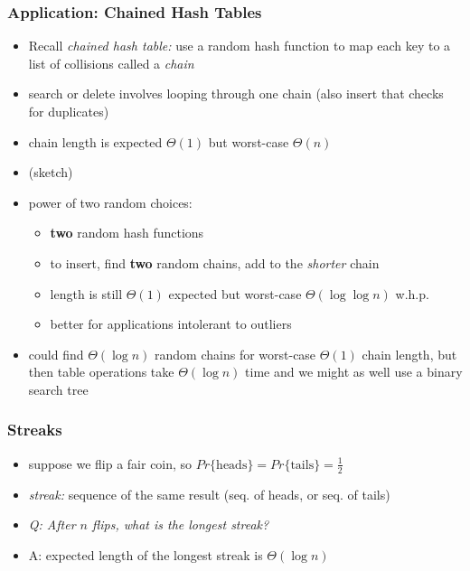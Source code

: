 \documentclass[10pt]{beamer}
\begin{document}
\begin{frame} \frametitle{Application: Chained Hash Tables}
\begin{itemize}
  \item Recall \emph{chained hash table:} use a random hash function to
    map each key to a list of collisions called a \emph{chain}
  \item search or delete involves looping through one chain (also insert
    that checks for duplicates)
  \item chain length is expected $\Theta(1)$ but worst-case $\Theta(n)$
  \item (sketch)
  \item power of two random choices:
    \begin{itemize}
      \item \textbf{two} random hash functions
      \item to insert, find \textbf{two} random chains, add to the \emph{shorter} chain
      \item length is still $\Theta(1)$ expected but worst-case $\Theta(\log \log n)$
        w.h.p.
      \item better for applications intolerant to outliers
    \end{itemize}
  \item could find $\Theta(\log n)$ random chains for worst-case $\Theta(1)$
    chain length, but then table operations take $\Theta(\log n)$ time
    and we might as well use a binary search tree
\end{itemize}
\end{frame}

\begin{frame} \frametitle{Streaks}
\begin{itemize}
  \item suppose we flip a fair coin, so $Pr\{\text{heads}\} = Pr\{\text{tails}\}=\frac{1}{2}$
  \item \emph{streak:} sequence of the same result (seq. of heads, or seq. of tails)
  \item \emph{Q: After $n$ flips, what is the longest streak?}
  \item A: expected length of the longest streak is $\Theta(\log n)$
\end{itemize}
\end{frame}
\end{document}
